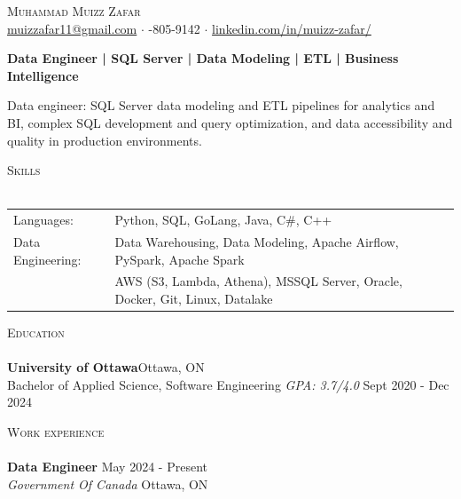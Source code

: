 \documentclass[a4paper]{article}
\newcommand{\lineunder} {
    \vspace*{-8pt} \\
    \hspace*{-18pt} \hrulefill \\
}
\newcommand{\header} [1] {
    {\hspace*{-18pt}\vspace*{6pt} \textsc{#1}}
    \vspace*{-6pt} \lineunder
}
\begin{document}
\vspace*{-40pt}
\vspace*{-10pt}
\begin{center}
	{\Huge \scshape {Muhammad Muizz Zafar}}\\
	\faSend \space \href{mailto:muizzafar11@gmail.com}{muizzafar11@gmail.com} $\cdot$ \faPhoneSquare {}-805-9142 $\cdot$ \faLinkedinSquare \space \href{https://www.linkedin.com/in/muizz-zafar/}{linkedin.com/in/muizz-zafar/}
	\\
\end{center}
\vspace{-5pt}
\begin{center}
\textbf{Data Engineer | SQL Server | Data Modeling | ETL | Business Intelligence}
\end{center}
\begin{center}
Data engineer: SQL Server data modeling and ETL pipelines for analytics and BI, complex SQL development and query optimization, and data accessibility and quality in production environments.
\end{center}
\header{Skills}
\begin{tabular}{ l l }
	Languages: & Python, SQL, GoLang, Java, C\#, C++ \\
Data Engineering: & Data Warehousing, Data Modeling, Apache Airflow, PySpark, Apache Spark\\
& AWS (S3, Lambda, Athena), MSSQL Server, Oracle, Docker, Git, Linux, Datalake
\end{tabular}
\header{Education}
\textbf{University of Ottawa}\hfill Ottawa, ON\\
Bachelor of Applied Science, Software Engineering \textit{GPA: 3.7/4.0} \hfill Sept 2020 - Dec 2024\\
\vspace{1mm}
\header{Work experience}
\vspace{1.5mm}
\textbf{Data Engineer} \hfill May 2024 - Present\\
\textit{Government Of Canada} \hfill Ottawa, ON\\
\vspace{-2mm}
\end{document}
